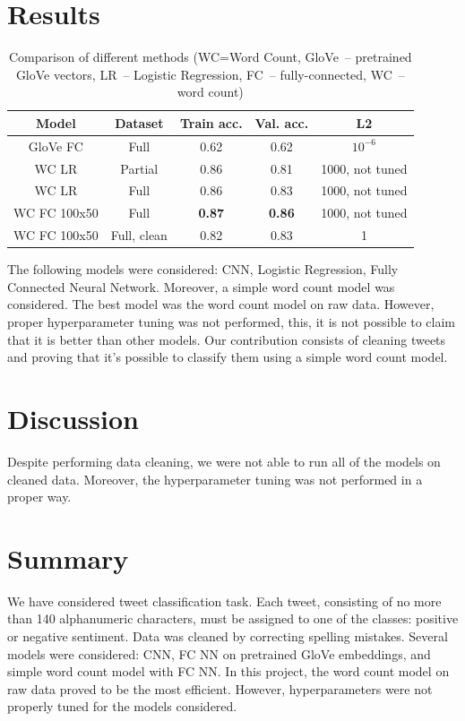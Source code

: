 \documentclass[10pt,conference,compsocconf]{IEEEtran}
\begin{document}
\section{Results}
\begin{table}[ht]
	\centering
	\small
	\begin{tabular}{|c | c |  c | c | c |} 
		\hline
		Model & Dataset & Train acc. & Val. acc. & L2 \\
		\hline
		GloVe FC & Full & 0.62 & 0.62 & $10^{-6}$\\
		\hline
		WC LR & Partial & 0.86 & 0.81 & 1000, not tuned\\
		\hline
		WC LR & Full & 0.86 & 0.83 & 1000, not tuned\\
		\hline
		WC FC 100x50 & Full & {\bf 0.87} & {\bf 0.86} & 1000, not tuned\\
		\hline
		WC FC 100x50 & Full, clean & 0.82 & 0.83 & 1\\ [1ex] 
		\hline
	\end{tabular}
	\caption{Comparison of different methods (WC=Word Count, GloVe~-- pretrained GloVe vectors, LR~-- Logistic Regression, FC~-- fully-connected, WC~-- word count)}
	\label{tab:results}
\end{table}

The following models were considered: CNN, Logistic Regression, Fully Connected Neural Network. Moreover, a simple word count model was considered. The best model was the word count model on raw data. However, proper hyperparameter tuning was not performed, this, it is not possible to claim that it is better than other models. Our contribution consists of cleaning tweets and proving that it's possible to classify them using a simple word count model.
\section{Discussion}
Despite performing data cleaning, we were not able to run all of the models on cleaned data. Moreover, the hyperparameter tuning was not performed in a proper way.
\section{Summary}
We have considered tweet classification task. Each tweet, consisting of no more than 140 alphanumeric characters, must be assigned to one of the classes: positive or negative sentiment. Data was cleaned by correcting spelling mistakes. Several models were considered: CNN, FC NN on pretrained GloVe embeddings, and simple word count model with FC NN. In this project, the word count model on raw data proved to be the most efficient. However, hyperparameters were not properly tuned for the models considered.
\end{document}
